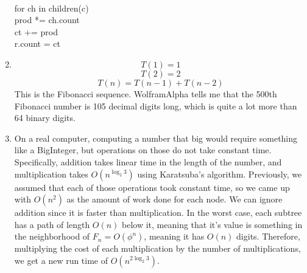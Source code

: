 \documentclass[11pt]{article}
\begin{document}
\begin{solution}
\begin{enumerate}
\begin{algo}
                \\ for ch in children(c) \+
                \\ prod *= ch.count \-
                \\ ct += prod \-
                \\ r.count = ct \-
            \end{algo}
        \item 
            \[
                T(1) = 1
            \]
            \[
            T(2) = 2
            \]
            \[
            T(n) = T(n - 1) + T(n - 2)
            \]
            This is the Fibonacci sequence. WolframAlpha tells me that the 500th Fibonacci number is 105 decimal digits long, which is quite a lot more than 64 binary digits.
        \item On a real computer, computing a number that big would require something like a BigInteger, but operations on those do not take constant time. Specifically, addition takes linear time in the length of the number, and multiplication takes $O(n^{\log_2{3}})$ using Karatsuba's algorithm. Previously, we assumed that each of those operations took constant time, so we came up with $O(n^2)$ as the amount of work done for each node. We can ignore addition since it is faster than multiplication. In the worst case, each subtree has a path of length $O(n)$ below it, meaning that it's value is something in the neighborhood of $F_n = O(\phi^n)$, meaning it has $O(n)$ digits. Therefore, multiplying the cost of each multiplication by the number of multiplications, we get a new run time of $O(n^{2\log_2{3}})$.
    \end{enumerate}
\end{solution}
\end{document}
